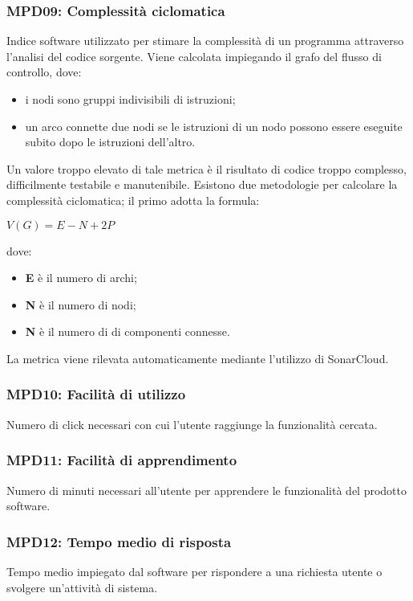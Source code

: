 \subsubsection{MPD09: Complessità ciclomatica}
Indice software utilizzato per stimare la complessità di un programma attraverso l’analisi del codice sorgente.
Viene calcolata impiegando il grafo del flusso di controllo, dove:
\begin{itemize}
    \item i nodi sono gruppi indivisibili di istruzioni;
    \item un arco connette due nodi se le istruzioni di un nodo possono essere eseguite subito dopo le istruzioni dell’altro.
\end{itemize}
Un valore troppo elevato di tale metrica è il risultato di codice troppo complesso, difficilmente testabile e manutenibile.
Esistono due metodologie per calcolare la complessità ciclomatica; il primo adotta la formula:
\begin{center}
    $V(G) = \displaystyle E - N + 2P$
\end{center}
dove:
\begin{itemize}
    \item \textbf{E} è il numero di archi;
    \item \textbf{N} è il numero di nodi;
    \item \textbf{N} è il numero di di componenti connesse.
\end{itemize}
La metrica viene rilevata automaticamente mediante l’utilizzo di {SonarCloud}\glo.

\subsubsection{MPD10: Facilità di utilizzo}
Numero di click necessari con cui l'utente raggiunge la funzionalità cercata.

\subsubsection{MPD11: Facilità di apprendimento}
Numero di minuti necessari all'utente per apprendere le funzionalità del prodotto software.

\subsubsection{MPD12: Tempo medio di risposta}
Tempo medio impiegato dal software per rispondere a una richiesta utente o svolgere un'attività di sistema.

